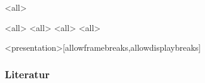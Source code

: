 \mode<all>{
}



\mode<all>{}
\mode<all>{}
\mode<all>{}
\mode<all>{}



 {
\begin{frame}<presentation>[allowframebreaks,allowdisplaybreaks]
  \frametitle{Literatur}
  \nocite{StoerI}
  \nocite{Rannacher0}
  
  
\end{frame}
}

 {
  \nocite{StoerI}
  \nocite{Deuflhard}
  \nocite{StoerII}
  \nocite{Rannacher0}
  \nocite{Schwarz}
  \nocite{GolubOrtega}
  \nocite{GolubVanLoan}
  \nocite{CDE}
  \nocite{SchabackWendland}
  \nocite{QuarteroniSaccoSaleri}
  
  
}


